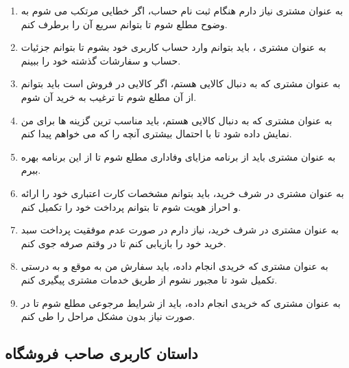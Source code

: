 \documentclass[12pt,a4paper]{article}
\begin{document}
\begin{enumerate}
	\item
به عنوان مشتری نیاز دارم هنگام ثبت نام حساب، اگر خطایی مرتکب می شوم به وضوح مطلع شوم تا بتوانم سریع آن را برطرف کنم.
\item
به عنوان مشتری ، باید بتوانم وارد حساب کاربری خود بشوم تا بتوانم جزئیات حساب و سفارشات گذشته خود را ببینم.
\item
به عنوان مشتری که به دنبال کالایی هستم، اگر کالایی در فروش است باید بتوانم از آن مطلع شوم تا ترغیب به خرید آن شوم.
\item
به عنوان مشتری که به دنبال کالایی هستم، باید مناسب ترین گزینه ها برای من نمایش داده شود تا با احتمال بیشتری آنچه را که می خواهم پیدا کنم.
\item
به عنوان مشتری باید از برنامه مزایای وفاداری مطلع شوم تا از این برنامه بهره ببرم.
\item
به عنوان مشتری در شرف خرید، باید بتوانم مشخصات کارت اعتباری خود را ارائه و احراز هویت شوم تا بتوانم پرداخت خود را تکمیل کنم.
\item
به عنوان مشتری در شرف خرید، نیاز دارم در صورت عدم موفقیت پرداخت سبد خرید خود را بازیابی کنم تا در وقتم صرفه جوی کنم.
\item
به عنوان مشتری که خریدی انجام داده، باید سفارش من به موقع و به درستی تکمیل شود تا مجبور نشوم از طریق خدمات مشتری پیگیری کنم.
\item
به عنوان مشتری که خریدی انجام داده، باید از شرایط مرجوعی مطلع شوم تا در صورت نیاز بدون مشکل مراحل را طی کنم.
\end{enumerate}

\subsection{\textbf{داستان کاربری صاحب فروشگاه}} \label{section.userStory.retailOwner}
\end{document}
